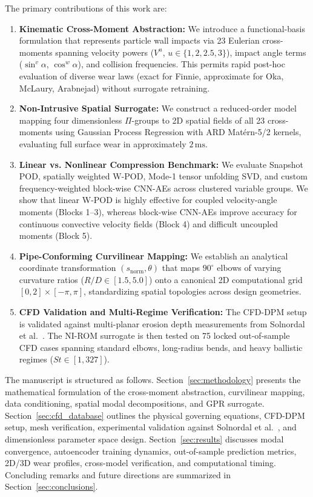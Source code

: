 \documentclass{article}
\begin{document}
The primary contributions of this work are:
\begin{enumerate}
    \item[(i)] \textbf{Kinematic Cross-Moment Abstraction:} We introduce a functional-basis formulation that represents particle wall impacts via 23 Eulerian cross-moments spanning velocity powers ($V^u$, $u \in \{1,2,2.5,3\}$), impact angle terms ($\sin^v\alpha$, $\cos^w\alpha$), and collision frequencies. This permits rapid post-hoc evaluation of diverse wear laws (exact for Finnie, approximate for Oka, McLaury, Arabnejad) without surrogate retraining.
    
    \item[(ii)] \textbf{Non-Intrusive Spatial Surrogate:} We construct a reduced-order model mapping four dimensionless $\Pi$-groups to 2D spatial fields of all 23 cross-moments using Gaussian Process Regression with ARD Mat\'ern-5/2 kernels, evaluating full surface wear in approximately $2\,\mathrm{ms}$.
    
    \item[(iii)] \textbf{Linear vs. Nonlinear Compression Benchmark:} We evaluate Snapshot POD, spatially weighted W-POD, Mode-1 tensor unfolding SVD, and custom frequency-weighted block-wise CNN-AEs across clustered variable groups. We show that linear W-POD is highly effective for coupled velocity-angle moments (Blocks 1--3), whereas block-wise CNN-AEs improve accuracy for continuous convective velocity fields (Block 4) and difficult uncoupled moments (Block 5).
    
    \item[(iv)] \textbf{Pipe-Conforming Curvilinear Mapping:} We establish an analytical coordinate transformation $(s_{\mathrm{norm}}, \theta)$ that maps $90^\circ$ elbows of varying curvature ratios ($R/D \in [1.5, 5.0]$) onto a canonical 2D computational grid $[0, 2] \times [-\pi, \pi]$, standardizing spatial topologies across design geometries.
    
    \item[(v)] \textbf{CFD Validation and Multi-Regime Verification:} The CFD-DPM setup is validated against multi-planar erosion depth measurements from Solnordal et al.~\cite{solnordal2015}. The NI-ROM surrogate is then tested on 75 locked out-of-sample CFD cases spanning standard elbows, long-radius bends, and heavy ballistic regimes ($St \in [1, 327]$).
\end{enumerate}

The manuscript is structured as follows. Section~\ref{sec:methodology} presents the mathematical formulation of the cross-moment abstraction, curvilinear mapping, data conditioning, spatial modal decompositions, and GPR surrogate. Section~\ref{sec:cfd_database} outlines the physical governing equations, CFD-DPM setup, mesh verification, experimental validation against Solnordal et al.~\cite{solnordal2015}, and dimensionless parameter space design. Section~\ref{sec:results} discusses modal convergence, autoencoder training dynamics, out-of-sample prediction metrics, 2D/3D wear profiles, cross-model verification, and computational timing. Concluding remarks and future directions are summarized in Section~\ref{sec:conclusions}.
\end{document}
